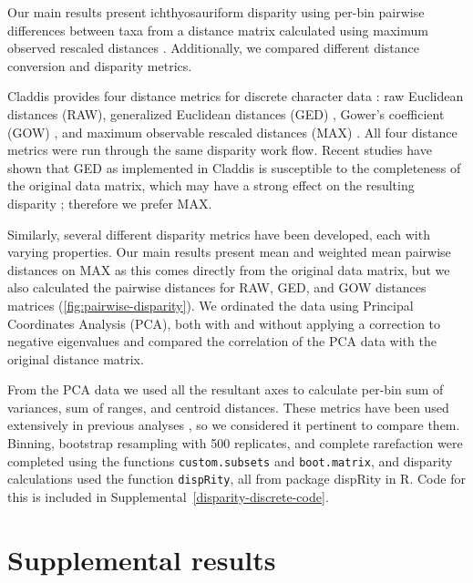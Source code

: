 \documentclass[british,a4paper]{article}
\newcommand\pcref[1]{(\cref{#1})}
\begin{document}
Our main results present ichthyosauriform disparity using per-bin pairwise
differences between taxa from a distance matrix calculated using maximum
observed rescaled distances \autocite{Lloyd2016BJLS}. Additionally, we compared
different distance conversion and disparity metrics.

Claddis provides four distance metrics for discrete character data
\autocite{Lloyd2016BJLS}: raw Euclidean distances (RAW), generalized Euclidean
distances (GED) \autocite{Wills1994P}, Gower's coefficient (GOW)
\autocite{Gower1971B}, and maximum observable rescaled distances (MAX)
\autocite{Lloyd2016BJLS}. All four distance metrics were run through the same
disparity work flow. Recent studies have shown that GED as implemented in
Claddis is susceptible to the completeness of the original data matrix, which
may have a strong effect on the resulting disparity
\autocite{FlannerySutherland2019PRSBBS, Lehmann2019P}; therefore we prefer MAX\@.

Similarly, several different disparity metrics have been developed, each with
varying properties. Our main results present mean and weighted mean pairwise
distances on MAX as this comes directly from the original data matrix, but we
also calculated the pairwise distances for RAW, GED, and GOW distances matrices
\pcref{fig:pairwise-disparity}. We ordinated the data using Principal
Coordinates Analysis (PCA), both with and without applying a correction to
negative eigenvalues \autocite{Caillez1983P} and compared the correlation of the
PCA data with the original distance matrix. 

From the PCA data we used all the resultant axes to calculate per-bin sum of
variances, sum of ranges, and centroid distances. These metrics have been used
extensively in previous analyses \autocite{Wills1998BJLS, Thorne2011PNAS,
FlannerySutherland2019PRSBBS}, so we considered it pertinent to compare them.
Binning, bootstrap resampling with 500 replicates, and complete rarefaction
were completed using the functions \texttt{custom.subsets} and
\texttt{boot.matrix}, and disparity calculations used the function
\texttt{dispRity}, all from package dispRity \autocite{Guillerme2018MEE} in R.
Code for this is included in Supplemental~\ref{disparity-discrete-code}.


\section{Supplemental results}\label{sec:supplemental-results}
\end{document}
